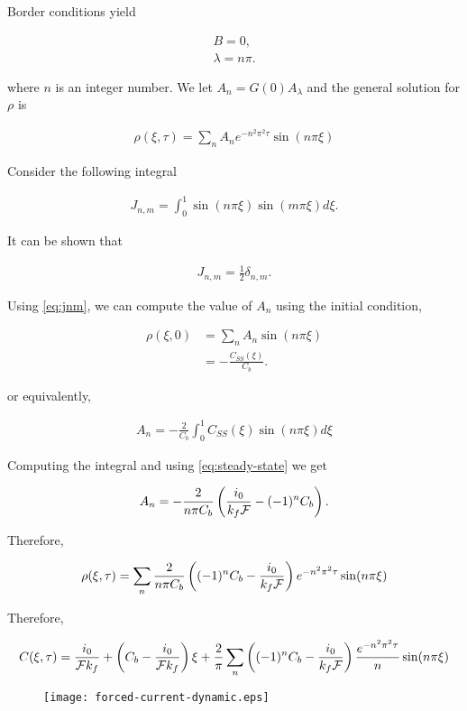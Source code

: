Border conditions yield 

\begin{align}
	B = 0,\\
	\lambda = n\pi.
\end{align}

where $n$ is an integer number. We let $A_n = G(0) A_\lambda$ and the general solution for $\rho$ is

\begin{align}
	\rho(\xi, \tau) = \sum_n A_n e^{-n^2\pi^2 \tau}\sin(n\pi \xi)
\end{align}


Consider the following integral

\begin{align}
	J_{n,m} = \int_0^1 \sin(n\pi\xi) \sin(m\pi\xi) d\xi.
\end{align}

It can be shown that 

\begin{align}
	J_{n,m} = \frac{1}{2}\delta_{n,m}.
	\label{eq:jnm}
\end{align}

Using \ref{eq:jnm}, we can compute the value of $A_n$ using the initial condition,

\begin{align}
	\rho(\xi, 0) &= \sum_n A_n \sin(n\pi\xi)\\
	 &= -\frac{C_{SS}(\xi)}{C_b}.
\end{align}

or equivalently,

\begin{align}
	A_n = -\frac{2}{C_b} \int_0^1 C_{SS}(\xi)\sin(n\pi\xi) d\xi
\end{align}

Computing the integral and using \ref{eq:steady-state} we get

\begin{align}
	A_n = -\frac{2}{n\pi C_b} \left({\frac{i_0}{k_f\mathcal{F}} - (-1)^n C_b}\right).
\end{align}


Therefore,

\begin{align}
	\rho(\xi, \tau) = \sum_n \frac{2}{n\pi C_b} \left({(-1)^n C_b- \frac{i_0}{k_f\mathcal{F}}}\right) e^{-n^2\pi^2\tau}\sin(n\pi\xi)
\end{align}


Therefore,

\begin{align}
	C(\xi, \tau) = \frac{i_0}{\mathcal{F}k_f} +\left({C_b - \frac{i_0}{\mathcal{F}k_f}}\right)\xi +\frac{2}{\pi}\sum_n \left({(-1)^n C_b- \frac{i_0}{k_f\mathcal{F}}}\right) \frac{e^{-n^2\pi^2\tau}}{n}\sin(n\pi\xi)
\end{align}


\begin{figure}[htbp]
\centering
\texttt{[image: forced-current-dynamic.eps]}
\caption{}
\label{fig:diffusion-reaction-comparison}
\end{figure}
